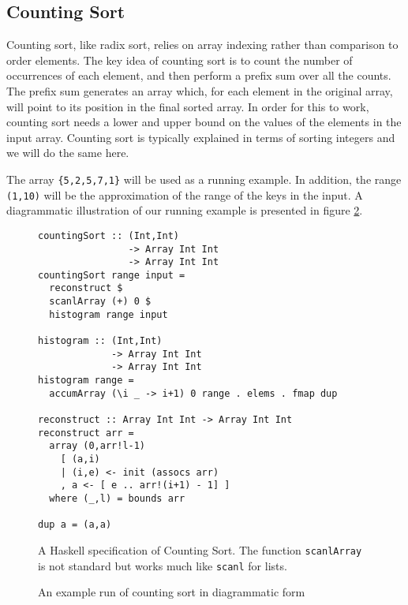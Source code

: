 \subsection{Counting Sort}
\label{sec:algorithm}

Counting sort, like radix sort, relies on array indexing rather than
comparison to order elements. The key idea of counting sort is to
count the number of occurrences of each element, and then perform a
prefix sum over all the counts. The prefix sum generates an array
which, for each element in the original array, will point to its
position in the final sorted array. In order for this to work,
counting sort needs a lower and upper bound on the values of the
elements in the input array. Counting sort is typically explained in
terms of sorting integers and we will do the same here.

The array \verb!{5,2,5,7,1}! will be used as a running example. In
addition, the range \verb!(1,10)! will be the approximation of the
range of the keys in the input. A diagrammatic illustration of our
running example is presented in figure \ref{fig:example}.

\begin{figure}
\begin{small} 
\begin{verbatim}
countingSort :: (Int,Int) 
                -> Array Int Int 
                -> Array Int Int
countingSort range input =
  reconstruct $
  scanlArray (+) 0 $
  histogram range input

histogram :: (Int,Int) 
             -> Array Int Int 
             -> Array Int Int
histogram range = 
  accumArray (\i _ -> i+1) 0 range . elems . fmap dup

reconstruct :: Array Int Int -> Array Int Int
reconstruct arr = 
  array (0,arr!l-1)
    [ (a,i)
    | (i,e) <- init (assocs arr)
    , a <- [ e .. arr!(i+1) - 1] ]
  where (_,l) = bounds arr

dup a = (a,a)
\end{verbatim}
\end{small}
\caption{A Haskell specification of Counting Sort. The function
  \texttt{scanlArray} is not standard but works much like
  \texttt{scanl}
  for lists.}
\label{fig:haskell}
\end{figure}

\begin{figure}
\centering

\caption{An example run of counting sort in diagrammatic form}
\label{fig:example}
\end{figure}
 
